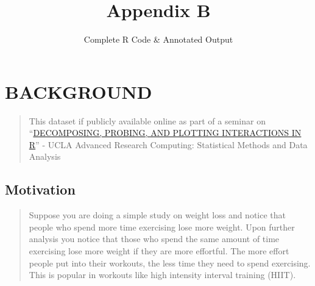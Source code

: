 \documentclass[
]{article}
\title{Appendix B}
\subtitle{Complete R Code \& Annotated Output}
\author{}
\date{\vspace{-2.5em}}
\begin{document}
\maketitle

\setcounter{page}{100}
\pagestyle{plain}

\setcounter{figure}{0}
\setcounter{table}{0}
\renewcommand{\thefigure}{B.\arabic{figure}}
\renewcommand{\thetable}{B.\arabic{table}}

\clearpage
\setcounter{tocdepth}{2}
\tableofcontents    
\clearpage
\listoftables
\clearpage
\listoffigures
\clearpage

\hypertarget{background}{%
\section{BACKGROUND}\label{background}}

\begin{quote}
This dataset if publicly available online as part of a seminar on
``\href{https://stats.oarc.ucla.edu/r/seminars/interactions-r/}{DECOMPOSING,
PROBING, AND PLOTTING INTERACTIONS IN R}'' - UCLA Advanced Research
Computing: Statistical Methods and Data Analysis
\end{quote}

\hypertarget{motivation}{%
\subsection{Motivation}\label{motivation}}

\begin{quote}
Suppose you are doing a simple study on weight loss and notice that
people who spend more time exercising lose more weight. Upon further
analysis you notice that those who spend the same amount of time
exercising lose more weight if they are more effortful. The more effort
people put into their workouts, the less time they need to spend
exercising. This is popular in workouts like high intensity interval
training (HIIT).
\end{quote}
\end{document}

